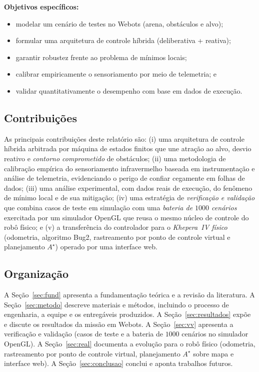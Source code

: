 \documentclass[11pt,a4paper]{article}
\begin{document}
\noindent\textbf{Objetivos específicos:}
\begin{itemize}[noitemsep,topsep=2pt]
  \item modelar um cenário de testes no Webots (arena, obstáculos e alvo);
  \item formular uma arquitetura de controle híbrida (deliberativa + reativa);
  \item garantir robustez frente ao problema de mínimos locais;
  \item calibrar empiricamente o sensoriamento por meio de telemetria; e
  \item validar quantitativamente o desempenho com base em dados de execução.
\end{itemize}

\subsection{Contribuições}
As principais contribuições deste relatório são: (i) uma arquitetura de controle híbrida arbitrada por máquina de estados finitos que une atração ao alvo, desvio reativo e \emph{contorno comprometido} de obstáculos; (ii) uma metodologia de calibração empírica do sensoriamento infravermelho baseada em instrumentação e análise de telemetria, evidenciando o perigo de confiar cegamente em folhas de dados; (iii) uma análise experimental, com dados reais de execução, do fenômeno de mínimo local e de sua mitigação; (iv) uma estratégia de \emph{verificação e validação} que combina casos de teste em simulação com uma \emph{bateria de $1000$ cenários} exercitada por um simulador OpenGL que reusa o mesmo núcleo de controle do robô físico; e (v) a transferência do controlador para o \emph{Khepera~IV físico} (odometria, algoritmo Bug2, rastreamento por ponto de controle virtual e planejamento $A^\star$) operado por uma interface web.

\subsection{Organização}
A Seção~\ref{sec:fund} apresenta a fundamentação teórica e a revisão da literatura. A Seção~\ref{sec:metodo} descreve materiais e métodos, incluindo o processo de engenharia, a equipe e os entregáveis produzidos. A Seção~\ref{sec:resultados} expõe e discute os resultados da missão em Webots. A Seção~\ref{sec:vv} apresenta a verificação e validação (casos de teste e a bateria de $1000$ cenários no simulador OpenGL). A Seção~\ref{sec:real} documenta a evolução para o robô físico (odometria, rastreamento por ponto de controle virtual, planejamento $A^\star$ sobre mapa e interface web). A Seção~\ref{sec:conclusao} conclui e aponta trabalhos futuros.
\end{document}
